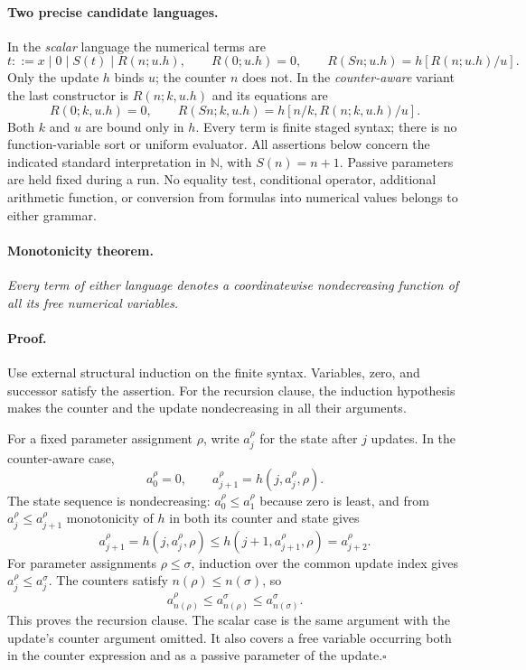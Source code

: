 \documentclass[11pt,letterpaper]{article}
\theoremstyle{definition}
\theoremstyle{remark}
\begin{document}
\paragraph{Two precise candidate languages.}
In the \emph{scalar} language the numerical terms are
\[
 t ::= x\mid 0\mid S(t)\mid R(n;u.h),
 \qquad
 R(0;u.h)=0,\qquad R(Sn;u.h)=h[R(n;u.h)/u].
 \tag{ZS}
\]
Only the update $h$ binds $u$; the counter $n$ does not. In the
\emph{counter-aware} variant the last constructor is $R(n;k,u.h)$ and its
equations are
\[
 R(0;k,u.h)=0,\qquad
 R(Sn;k,u.h)=h[n/k,R(n;k,u.h)/u].
 \tag{ZC}
\]
Both $k$ and $u$ are bound only in $h$. Every term is finite staged syntax;
there is no function-variable sort or uniform evaluator. All assertions
below concern the indicated standard interpretation in $\mathbb N$, with
$S(n)=n+1$. Passive parameters are held fixed during a run. No equality
test, conditional operator, additional arithmetic function, or conversion
from formulas into numerical values belongs to either grammar.

\paragraph{Monotonicity theorem.}
\emph{Every term of either language denotes a coordinatewise nondecreasing
function of all its free numerical variables.}

\paragraph{Proof.}
Use external structural induction on the finite syntax. Variables, zero,
and successor satisfy the assertion. For the recursion clause, the
induction hypothesis makes the counter and the update nondecreasing in
all their arguments.

For a fixed parameter assignment $\rho$, write $a_j^\rho$ for the state
after $j$ updates. In the counter-aware case,
\[
 a_0^\rho=0,\qquad
 a_{j+1}^\rho=h(j,a_j^\rho,\rho).
\]
The state sequence is nondecreasing: $a_0^\rho\le a_1^\rho$ because
zero is least, and from $a_j^\rho\le a_{j+1}^\rho$ monotonicity of
$h$ in both its counter and state gives
\[
 a_{j+1}^\rho=h(j,a_j^\rho,\rho)
 \le h(j+1,a_{j+1}^\rho,\rho)=a_{j+2}^\rho.
\]
For parameter assignments $\rho\le\sigma$, induction over the common
update index gives $a_j^\rho\le a_j^\sigma$. The counters satisfy
$n(\rho)\le n(\sigma)$, so
\[
 a_{n(\rho)}^\rho
 \le a_{n(\rho)}^\sigma
 \le a_{n(\sigma)}^\sigma.
\]
This proves the recursion clause. The scalar case is the same argument
with the update's counter argument omitted. It also covers a free
variable occurring both in the counter expression and as a passive
parameter of the update.\hfill$\square$
\end{document}
